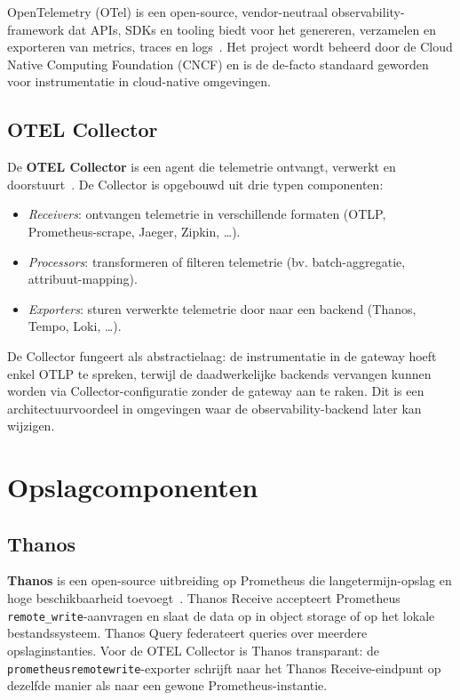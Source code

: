 OpenTelemetry (OTel) is een open-source, vendor-neutraal observability-framework dat APIs, SDKs en tooling biedt voor het genereren, verzamelen en exporteren van metrics, traces en logs~\autocite{OpenTelemetry2024}. Het project wordt beheerd door de Cloud Native Computing Foundation (CNCF) en is de de-facto standaard geworden voor instrumentatie in cloud-native omgevingen.

\subsection{OTEL Collector}

De \textbf{OTEL Collector} is een agent die telemetrie ontvangt, verwerkt en doorstuurt~\autocite{OpenTelemetry2024Collector}. De Collector is opgebouwd uit drie typen componenten:

\begin{itemize}
  \item \textit{Receivers}: ontvangen telemetrie in verschillende formaten (OTLP, Prometheus-scrape, Jaeger, Zipkin, \ldots).
  \item \textit{Processors}: transformeren of filteren telemetrie (bv. batch-aggregatie, attribuut-mapping).
  \item \textit{Exporters}: sturen verwerkte telemetrie door naar een backend (Thanos, Tempo, Loki, \ldots).
\end{itemize}

De Collector fungeert als abstractielaag: de instrumentatie in de gateway hoeft enkel OTLP te spreken, terwijl de daadwerkelijke backends vervangen kunnen worden via Collector-configuratie zonder de gateway aan te raken. Dit is een architectuurvoordeel in omgevingen waar de observability-backend later kan wijzigen.

\section{Opslagcomponenten}%
\label{sec:opslagcomponenten}

\subsection{Thanos}

\textbf{Thanos} is een open-source uitbreiding op Prometheus die langetermijn-opslag en hoge beschikbaarheid toevoegt~\autocite{Thanos2024}. Thanos Receive accepteert Prometheus \texttt{remote\_write}-aanvragen en slaat de data op in object storage of op het lokale bestandssysteem. Thanos Query federateert queries over meerdere opslaginstanties. Voor de OTEL Collector is Thanos transparant: de \texttt{prometheusremotewrite}-exporter schrijft naar het Thanos Receive-eindpunt op dezelfde manier als naar een gewone Prometheus-instantie.

